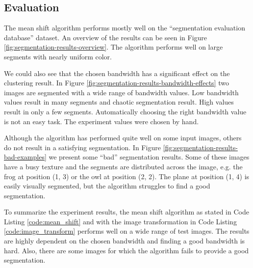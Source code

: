 \documentclass{article}
\begin{document}
\subsection{Evaluation}

The mean shift algorithm performs mostly well on the ``segmentation evaluation database'' dataset. An overview of the results can be seen in Figure \ref{fig:segmentation-results-overview}. The algorithm performs well on large segments with nearly uniform color.

We could also see that the chosen bandwidth has a significant effect on the clustering result. In Figure \ref{fig:segmentation-results-bandwidth-effects} two images are segmented with a wide range of bandwidth values. Low bandwidth values result in many segments and chaotic segmentation result. High values result in only a few segments. Automatically choosing the right bandwidth value is not an easy task. The experiment values were chosen by hand.

Although the algorithm has performed quite well on some input images, others do not result in a satisfying segmentation. In Figure \ref{fig:segmentation-results-bad-examples} we present some ``bad'' segmentation results. Some of these images have a busy texture and the segments are distributed across the image, e.g. the frog at position (1, 3) or the owl at position (2, 2). The plane at position (1, 4) is easily visually segmented, but the algorithm struggles to find a good segmentation.

To summarize the experiment results, the mean shift algorithm as stated in Code Listing \ref{code:mean_shift} and with the image transformation in Code Listing \ref{code:image_transform} performs well on a wide range of test images. The results are highly dependent on the chosen bandwidth and finding a good bandwidth is hard. Also, there are some images for which the algorithm fails to provide a good segmentation.
\end{document}
